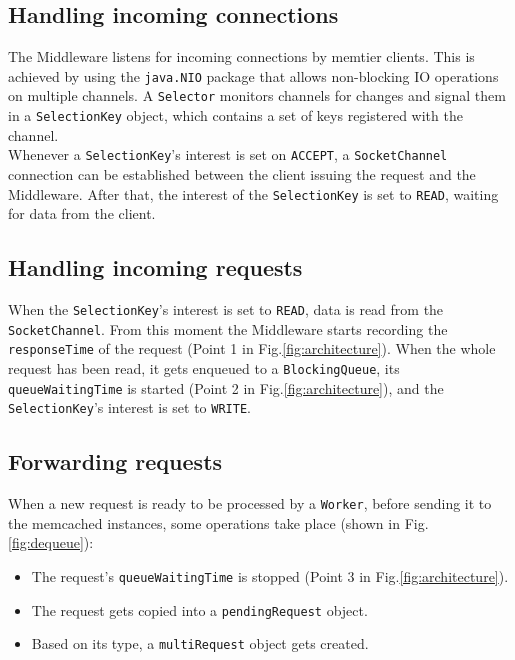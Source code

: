 \documentclass[11pt,a4paper]{article}
\begin{document}
\subsection{Handling incoming connections}

The Middleware listens for incoming connections by memtier clients. This is achieved by using the \texttt{java.NIO} package that allows non-blocking IO operations on multiple channels. A \texttt{Selector} monitors channels for changes and signal them in a \texttt{SelectionKey} object, which contains a set of keys registered with the channel. \\Whenever a \texttt{SelectionKey}'s interest is set on \texttt{ACCEPT}, a \texttt{SocketChannel} connection can be established between the client issuing the request and the Middleware. After that, the interest of the \texttt{SelectionKey} is set to \texttt{READ}, waiting for data from the client.

\subsection{Handling incoming requests}

When the \texttt{SelectionKey}'s interest is set to \texttt{READ}, data is read from the \texttt{SocketChannel}. From this moment the Middleware starts recording the \texttt{responseTime} of the request (Point 1 in Fig.\ref{fig:architecture}). When the whole request has been read, it gets enqueued to a \texttt{BlockingQueue}, its \texttt{queueWaitingTime} is started (Point 2 in Fig.\ref{fig:architecture}), and the \texttt{SelectionKey}'s interest is set to \texttt{WRITE}.

\subsection{Forwarding requests}

When a new request is ready to be processed by a \texttt{Worker}, before sending it to the memcached instances, some operations take place (shown in Fig.\ref{fig:dequeue}):

\begin{itemize}
    \item The request's \texttt{queueWaitingTime} is stopped (Point 3 in Fig.\ref{fig:architecture}).
    \item The request gets copied into a \texttt{pendingRequest} object.
    \item Based on its type, a \texttt{multiRequest} object gets created.
\end{itemize}
\end{document}
